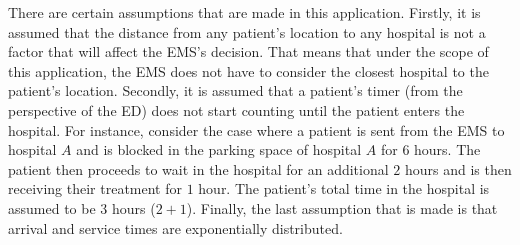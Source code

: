 There are certain assumptions that are made in this application.
Firstly, it is assumed that the distance from any patient's location to any
hospital is not a factor that will affect the EMS's decision.
That means that under the scope of this application, the EMS does not have to
consider the closest hospital to the patient's location.
Secondly, it is assumed that a patient's timer (from the perspective of the ED)
does not start counting until the patient enters the hospital.
For instance, consider the case where a patient is sent from the EMS to hospital
\(A\) and is blocked in the parking space of hospital \(A\) for \(6\) hours.
The patient then proceeds to wait in the hospital for an additional \(2\) hours
and is then receiving their treatment for \(1\) hour.
The patient's total time in the hospital is assumed to be \(3\) hours (\(2+1\)).
Finally, the last assumption that is made is that arrival and service times are
exponentially distributed.
